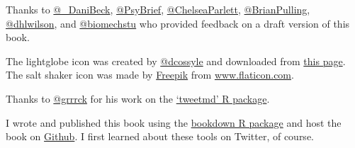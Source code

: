 \documentclass[
]{book}
\begin{document}
Thanks to \href{https://twitter.com/_DaniBeck}{@\_DaniBeck}, \href{https://twitter.com/PsyBrief}{@PsyBrief}, \href{https://twitter.com/@ChelseaParlett}{@ChelseaParlett}, \href{https://twitter.com/BrianPulling}{@BrianPulling},
\href{https://twitter.com/dhlwilson}{@dhlwilson}, and \href{https://twitter.com/biomechstu}{@biomechstu} who provided feedback on a draft version of this book.

The lightglobe icon was created by \href{https://twitter.com/dcossyle}{@dcossyle} and downloaded from \href{https://desiree.rbind.io/post/2019/making-tip-boxes-with-bookdown-and-rmarkdown/}{this page}. The salt shaker icon was made by \href{https://www.flaticon.com/authors/freepik}{Freepik} from \href{http://www.flaticon.com/}{www.flaticon.com}.

Thanks to \href{https://twitter.com/grrrck}{@grrrck} for his work on the \href{https://github.com/gadenbuie/tweetrmd}{`tweetmd' R package}.

I wrote and published this book using the \href{https://bookdown.org/}{bookdown R package} and host the book on \href{https://github.com/dsquintana/t4scientists}{Github}. I first learned about these tools on Twitter, of course.

  
\end{document}
